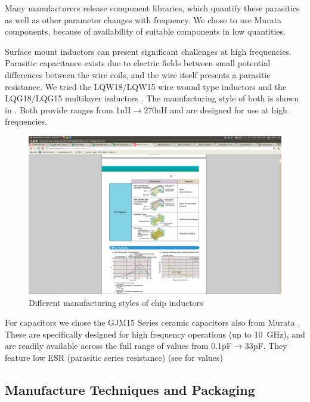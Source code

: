 Many manufacturers release component libraries, which quantify these parasitics as well as other parameter changes with frequency. We chose to use Murata components, because of availability of suitable components in low quantities. 

Surface mount inductors can present significant challenges at high frequencies. Parasitic capacitance exists due to electric fields between small potential differences between the wire coils, and the wire itself presents a parasitic resistance. We tried the LQW18/LQW15 wire wound type inductors and the LQG18/LQG15 multilayer inductors \cite{murataInductors}. The manufacturing style of both is shown in . Both provide ranges from 1nH$\rightarrow$270nH and are designed for use at high frequencies.

\begin{figure}[ht]
 \centering
 \includegraphics[width=\textwidth]{./images/LowFrequencyFilters/inductorStyles.png}
 \caption{Different manufacturing styles of chip inductors \cite{murataInductors}}
 \label{fig:inductorStyles}
\end{figure}

For capacitors we chose the GJM15 Series ceramic capacitors also from Murata \cite{MurataCapacitors}. These are specifically designed for high frequency operations (up to 10~GHz), and are readily available across the full range of values from 0.1pF$\rightarrow$33pF. They feature low ESR (parasitic series resistance) (see \cite{MurataCapacitors} for values) 


  \subsection{Manufacture Techniques and Packaging}

